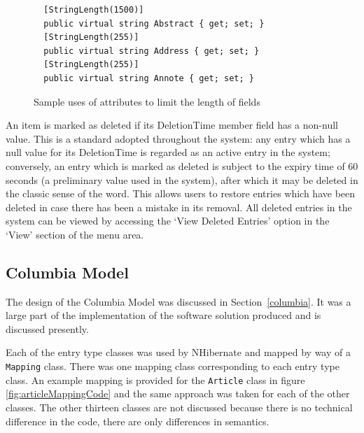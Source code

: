 \begin{figure}
	\begin{center}
			\lstset{language=CSharp} 
			\begin{lstlisting}
  [StringLength(1500)]
  public virtual string Abstract { get; set; }
  [StringLength(255)]
  public virtual string Address { get; set; }
  [StringLength(255)]
  public virtual string Annote { get; set; }				
			\end{lstlisting}
		\caption{Sample uses of attributes to limit the length of fields}
		\label{fig:fieldLen}
	\end{center}
\end{figure}

An item is marked as deleted if its DeletionTime member field has a non-null value.  This is a standard adopted throughout the system: any entry which has a null value for its DeletionTime is regarded as an active entry in the system; conversely, an entry which is marked as deleted is subject to the expiry time of 60 seconds (a preliminary value used in the system), after which it may be deleted in the classic sense of the word.  This allows users to restore entries which have been deleted in case there has been a mistake in its removal.  All deleted entries in the system can be viewed by accessing the `View Deleted Entries' option in the `View' section of the menu area.

\subsection{Columbia Model}
The design of the Columbia Model was discussed in Section~\ref{columbia}.  It was a large part of the implementation of the software solution produced and is discussed presently.

Each of the entry type classes was used by NHibernate and mapped by way of a \texttt{Mapping} class.  There was one mapping class corresponding to each entry type class.  An example mapping is provided for the \texttt{Article} class in figure \ref{fig:articleMappingCode} and the same approach was taken for each of the other classes.  The other thirteen classes are not discussed because there is no technical difference in the code, there are only differences in semantics.

